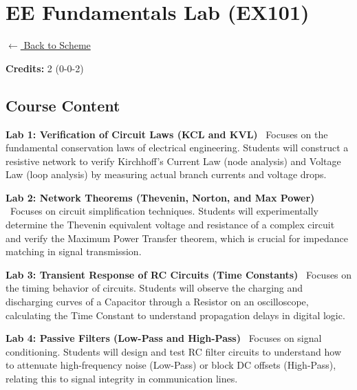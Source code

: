 \section*{EE Fundamentals Lab (EX101)}
\label{course:EX101}

\noindent \small{\hyperref[main:scheme]{$\leftarrow$ Back to Scheme}} \vspace{0.5cm}

\noindent \textbf{Credits:} 2 (0-0-2)

\subsection*{Course Content}
\noindent\textbf{Lab 1: Verification of Circuit Laws (KCL and KVL)} \
Focuses on the fundamental conservation laws of electrical engineering. Students will construct a resistive network to verify Kirchhoff’s Current Law (node analysis) and Voltage Law (loop analysis) by measuring actual branch currents and voltage drops. \\

\vspace{0.2cm}

\noindent\textbf{Lab 2: Network Theorems (Thevenin, Norton, and Max Power)} \
Focuses on circuit simplification techniques. Students will experimentally determine the Thevenin equivalent voltage and resistance of a complex circuit and verify the Maximum Power Transfer theorem, which is crucial for impedance matching in signal transmission. \\

\vspace{0.2cm}

\noindent\textbf{Lab 3: Transient Response of RC Circuits (Time Constants)} \
Focuses on the timing behavior of circuits. Students will observe the charging and discharging curves of a Capacitor through a Resistor on an oscilloscope, calculating the Time Constant to understand propagation delays in digital logic. \\

\vspace{0.2cm}

\noindent\textbf{Lab 4: Passive Filters (Low-Pass and High-Pass)} \
Focuses on signal conditioning. Students will design and test RC filter circuits to understand how to attenuate high-frequency noise (Low-Pass) or block DC offsets (High-Pass), relating this to signal integrity in communication lines. \\

